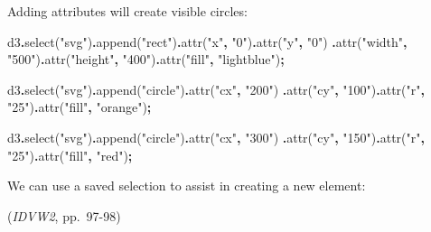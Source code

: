 \documentclass[
  openany]{book}
\newenvironment{Shaded}{\begin{snugshade}}{\end{snugshade}}
\newcommand{\FunctionTok}[1]{\textcolor[rgb]{0.00,0.00,0.00}{#1}}
\newcommand{\NormalTok}[1]{#1}
\newcommand{\OperatorTok}[1]{\textcolor[rgb]{0.81,0.36,0.00}{\textbf{#1}}}
\newcommand{\StringTok}[1]{\textcolor[rgb]{0.31,0.60,0.02}{#1}}
\begin{document}
Adding attributes will create visible circles:

\begin{Shaded}
\begin{Highlighting}[]
\NormalTok{d3}\OperatorTok{.}\FunctionTok{select}\NormalTok{(}\StringTok{"svg"}\NormalTok{)}\OperatorTok{.}\FunctionTok{append}\NormalTok{(}\StringTok{"rect"}\NormalTok{)}\OperatorTok{.}\FunctionTok{attr}\NormalTok{(}\StringTok{"x"}\OperatorTok{,} \StringTok{"0"}\NormalTok{)}\OperatorTok{.}\FunctionTok{attr}\NormalTok{(}\StringTok{"y"}\OperatorTok{,} \StringTok{"0"}\NormalTok{)}
    \OperatorTok{.}\FunctionTok{attr}\NormalTok{(}\StringTok{"width"}\OperatorTok{,} \StringTok{"500"}\NormalTok{)}\OperatorTok{.}\FunctionTok{attr}\NormalTok{(}\StringTok{"height"}\OperatorTok{,} \StringTok{"400"}\NormalTok{)}\OperatorTok{.}\FunctionTok{attr}\NormalTok{(}\StringTok{"fill"}\OperatorTok{,} \StringTok{"lightblue"}\NormalTok{)}\OperatorTok{;}
    
\NormalTok{d3}\OperatorTok{.}\FunctionTok{select}\NormalTok{(}\StringTok{"svg"}\NormalTok{)}\OperatorTok{.}\FunctionTok{append}\NormalTok{(}\StringTok{"circle"}\NormalTok{)}\OperatorTok{.}\FunctionTok{attr}\NormalTok{(}\StringTok{"cx"}\OperatorTok{,} \StringTok{"200"}\NormalTok{)}
    \OperatorTok{.}\FunctionTok{attr}\NormalTok{(}\StringTok{"cy"}\OperatorTok{,} \StringTok{"100"}\NormalTok{)}\OperatorTok{.}\FunctionTok{attr}\NormalTok{(}\StringTok{"r"}\OperatorTok{,} \StringTok{"25"}\NormalTok{)}\OperatorTok{.}\FunctionTok{attr}\NormalTok{(}\StringTok{"fill"}\OperatorTok{,} \StringTok{"orange"}\NormalTok{)}\OperatorTok{;}
    
\NormalTok{d3}\OperatorTok{.}\FunctionTok{select}\NormalTok{(}\StringTok{"svg"}\NormalTok{)}\OperatorTok{.}\FunctionTok{append}\NormalTok{(}\StringTok{"circle"}\NormalTok{)}\OperatorTok{.}\FunctionTok{attr}\NormalTok{(}\StringTok{"cx"}\OperatorTok{,} \StringTok{"300"}\NormalTok{)}
    \OperatorTok{.}\FunctionTok{attr}\NormalTok{(}\StringTok{"cy"}\OperatorTok{,} \StringTok{"150"}\NormalTok{)}\OperatorTok{.}\FunctionTok{attr}\NormalTok{(}\StringTok{"r"}\OperatorTok{,} \StringTok{"25"}\NormalTok{)}\OperatorTok{.}\FunctionTok{attr}\NormalTok{(}\StringTok{"fill"}\OperatorTok{,} \StringTok{"red"}\NormalTok{)}\OperatorTok{;}  
\end{Highlighting}
\end{Shaded}

We can use a saved selection to assist in creating a new element:

(\emph{IDVW2}, pp.~97-98)
\end{document}
